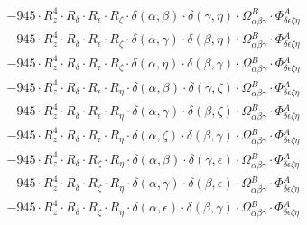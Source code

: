 \documentclass{article}
\begin{document}
\begin{equation}
\begin{array}{c}
 \\[0.2em] 		 - 945 \cdot R_{z}^{4} \cdot R_{\delta{}} \cdot R_{\epsilon{}} \cdot R_{\zeta{}} \cdot \delta{}\left(\alpha{}, \beta{}\right) \cdot \delta{}\left(\gamma{}, \eta{}\right) \cdot \Omega{}^{B}_{\alpha{}\beta{}\gamma{}} \cdot \Phi{}^{A}_{\delta{}\epsilon{}\zeta{}\eta{}} 
 \\[0.2em] 		 - 945 \cdot R_{z}^{4} \cdot R_{\delta{}} \cdot R_{\epsilon{}} \cdot R_{\zeta{}} \cdot \delta{}\left(\alpha{}, \gamma{}\right) \cdot \delta{}\left(\beta{}, \eta{}\right) \cdot \Omega{}^{B}_{\alpha{}\beta{}\gamma{}} \cdot \Phi{}^{A}_{\delta{}\epsilon{}\zeta{}\eta{}} 
 \\[0.2em] 		 - 945 \cdot R_{z}^{4} \cdot R_{\delta{}} \cdot R_{\epsilon{}} \cdot R_{\zeta{}} \cdot \delta{}\left(\alpha{}, \eta{}\right) \cdot \delta{}\left(\beta{}, \gamma{}\right) \cdot \Omega{}^{B}_{\alpha{}\beta{}\gamma{}} \cdot \Phi{}^{A}_{\delta{}\epsilon{}\zeta{}\eta{}} 
 \\[0.2em] 		 - 945 \cdot R_{z}^{4} \cdot R_{\delta{}} \cdot R_{\epsilon{}} \cdot R_{\eta{}} \cdot \delta{}\left(\alpha{}, \beta{}\right) \cdot \delta{}\left(\gamma{}, \zeta{}\right) \cdot \Omega{}^{B}_{\alpha{}\beta{}\gamma{}} \cdot \Phi{}^{A}_{\delta{}\epsilon{}\zeta{}\eta{}} 
 \\[0.2em] 		 - 945 \cdot R_{z}^{4} \cdot R_{\delta{}} \cdot R_{\epsilon{}} \cdot R_{\eta{}} \cdot \delta{}\left(\alpha{}, \gamma{}\right) \cdot \delta{}\left(\beta{}, \zeta{}\right) \cdot \Omega{}^{B}_{\alpha{}\beta{}\gamma{}} \cdot \Phi{}^{A}_{\delta{}\epsilon{}\zeta{}\eta{}} 
 \\[0.2em] 		 - 945 \cdot R_{z}^{4} \cdot R_{\delta{}} \cdot R_{\epsilon{}} \cdot R_{\eta{}} \cdot \delta{}\left(\alpha{}, \zeta{}\right) \cdot \delta{}\left(\beta{}, \gamma{}\right) \cdot \Omega{}^{B}_{\alpha{}\beta{}\gamma{}} \cdot \Phi{}^{A}_{\delta{}\epsilon{}\zeta{}\eta{}} 
 \\[0.2em] 		 - 945 \cdot R_{z}^{4} \cdot R_{\delta{}} \cdot R_{\zeta{}} \cdot R_{\eta{}} \cdot \delta{}\left(\alpha{}, \beta{}\right) \cdot \delta{}\left(\gamma{}, \epsilon{}\right) \cdot \Omega{}^{B}_{\alpha{}\beta{}\gamma{}} \cdot \Phi{}^{A}_{\delta{}\epsilon{}\zeta{}\eta{}} 
 \\[0.2em] 		 - 945 \cdot R_{z}^{4} \cdot R_{\delta{}} \cdot R_{\zeta{}} \cdot R_{\eta{}} \cdot \delta{}\left(\alpha{}, \gamma{}\right) \cdot \delta{}\left(\beta{}, \epsilon{}\right) \cdot \Omega{}^{B}_{\alpha{}\beta{}\gamma{}} \cdot \Phi{}^{A}_{\delta{}\epsilon{}\zeta{}\eta{}} 
 \\[0.2em] 		 - 945 \cdot R_{z}^{4} \cdot R_{\delta{}} \cdot R_{\zeta{}} \cdot R_{\eta{}} \cdot \delta{}\left(\alpha{}, \epsilon{}\right) \cdot \delta{}\left(\beta{}, \gamma{}\right) \cdot \Omega{}^{B}_{\alpha{}\beta{}\gamma{}} \cdot \Phi{}^{A}_{\delta{}\epsilon{}\zeta{}\eta{}} 

\end{array}
\end{equation}
\end{document}
